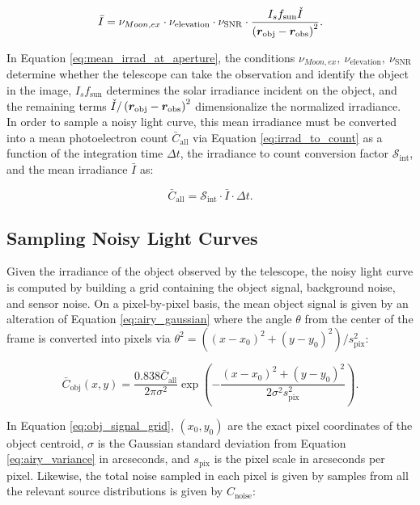 \begin{equation} \label{eq:mean_irrad_at_aperture}
  \bar{I} = \nu_{Moon,ex} \cdot \nu_\mathrm{elevation} \cdot \nu_{\mathrm{SNR}} \cdot \frac{I_s f_\mathrm{sun} \check{I}}{\left( \bm{r}_\mathrm{obj} - \bm{r}_\mathrm{obs} \right)^2}.
\end{equation}

In Equation \ref{eq:mean_irrad_at_aperture}, the conditions $\nu_{Moon,ex},\: \nu_\mathrm{elevation},\: \nu_{\mathrm{SNR}}$ determine whether the telescope can take the observation and identify the object in the image, $I_s f_\mathrm{sun}$ determines the solar irradiance incident on the object, and the remaining terms $\check{I} / \left( \bm{r}_\mathrm{obj} - \bm{r}_\mathrm{obs} \right)^2$ dimensionalize the normalized irradiance. In order to sample a noisy light curve, this mean irradiance must be converted into a mean photoelectron count $\bar{C}_\mathrm{all}$ via Equation \ref{eq:irrad_to_count} as a function of the integration time $\Delta t$, the irradiance to count conversion factor $\mathcal{S}_\mathrm{int}$, and the mean irradiance $\bar{I}$ as:

\begin{equation}
  \bar{C}_\mathrm{all} = \mathcal{S}_\mathrm{int} \cdot \bar{I} \cdot \Delta t.
\end{equation}

\subsection{Sampling Noisy Light Curves} \label{sec:sampling_lcs}

Given the irradiance of the object observed by the telescope, the noisy light curve is computed by building a grid containing the object signal, background noise, and sensor noise. On a pixel-by-pixel basis, the mean object signal is given by an alteration of Equation \ref{eq:airy_gaussian} where the angle $\theta$ from the center of the frame is converted into pixels via $\theta^2 = \left((x - x_0)^2 + (y - y_0)^2 \right) / s_\mathrm{pix}^2$:

\begin{equation} \label{eq:obj_signal_grid}
  \bar{C}_\mathrm{obj}(x, y) = \frac{0.838 \bar{C}_\mathrm{all}}{2 \pi \sigma^2} \exp\left( - \frac{(x - x_0)^2 + (y - y_0)^2}{2 \sigma^2  s_\mathrm{pix}^2} \right).
\end{equation}

In Equation \ref{eq:obj_signal_grid}, $\left(x_0, y_0\right)$ are the exact pixel coordinates of the object centroid, $\sigma$ is the Gaussian standard deviation from Equation \ref{eq:airy_variance} in arcseconds, and $s_\mathrm{pix}$ is the pixel scale in arcseconds per pixel. Likewise, the total noise sampled in each pixel is given by samples from all the relevant source distributions is given by $C_\mathrm{noise}$:

